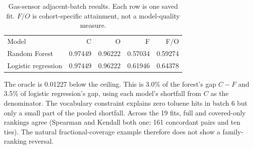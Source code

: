 \documentclass{article}
\begin{document}
\begin{table}[h]\centering
\caption{Gas-sensor adjacent-batch results. Each row is one saved fit. \(F/O\) is cohort-specific attainment, not a model-quality measure.}
\begin{tabular}{lrrrr}
Model & C & O & F & F/O \\
Random Forest & 0.97449 & 0.96222 & 0.57034 & 0.59274 \\
Logistic regression & 0.97449 & 0.96222 & 0.61946 & 0.64378 \\
\end{tabular}\end{table}

The oracle is 0.01227 below the ceiling. This is 3.0\% of the forest's gap \(C-F\) and 3.5\% of logistic regression's gap, using each model's shortfall from \(C\) as the denominator. The vocabulary constraint explains zero toluene hits in batch 6 but only a small part of the pooled shortfall. Across the 19 fits, full and covered-only rankings agree (Spearman and Kendall both one; 161 concordant pairs and ten ties). The natural fractional-coverage example therefore does not show a family-ranking reversal.



\end{document}
